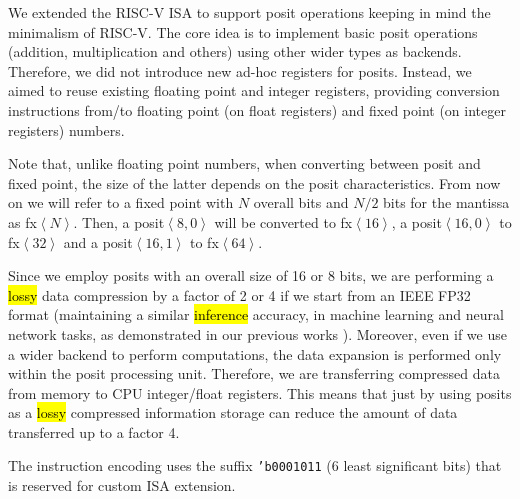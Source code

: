 We extended the RISC-V ISA to support posit operations keeping in mind the minimalism of RISC-V. The core idea is to implement basic posit operations (addition, multiplication and others) using other wider types as backends. Therefore, we did not introduce new ad-hoc registers for posits. Instead, we aimed to reuse existing floating point and integer registers, providing conversion instructions from/to floating point (on float registers) and fixed point (on integer registers) numbers. 

Note that, unlike floating point numbers, when converting between posit and fixed point, the size of the latter depends on the posit characteristics. From now on we will refer to  a fixed point with $N$ overall bits and $N/2$ bits for the mantissa  as fx$\left<N\right>$. Then, a posit$\left<8,0\right>$ will be converted to fx$\left<16\right>$,  a posit$\left<16,0\right>$ to fx$\left<32\right>$ and a posit$\left<16,1\right>$ to fx$\left<64\right>$.

Since we employ posits with an overall size of 16 or 8 bits, we are performing a \hl{lossy} data compression by a factor of 2 or 4 if we start from an IEEE FP32 format (maintaining a similar \hl{inference} accuracy, in machine learning and neural network tasks, as demonstrated in our previous works \cite{coco_et_al_ieeespm_2020,coco2020sensors}). Moreover, even if we use a wider backend to perform computations, the data expansion is performed only within the posit processing unit. Therefore, we are transferring compressed data from memory to CPU integer/float registers. This means that just by using posits as a \hl{lossy} compressed information storage can reduce the amount of data transferred up to a factor 4.

The instruction encoding uses the suffix \texttt{'b0001011} (6 least significant bits) that is reserved for custom ISA extension.

